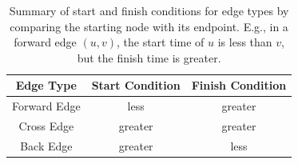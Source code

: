 \begin{table}[h]
    \centering
    \begin{tabular}{|c|c|c|}
        \hline
        \textbf{Edge Type} & \textbf{Start Condition} & \textbf{Finish Condition} \\ \hline
        Forward Edge & less & greater \\ \hline
        Cross Edge & greater & greater \\ \hline
        Back Edge & greater & less \\ \hline
    \end{tabular}
    \caption{Summary of start and finish conditions for edge types by comparing the starting node 
    with its endpoint. E.g., in a forward edge $(u, v)$, the start time of $u$ is less than $v$, but the finish time is greater.}
    \label{tab:edge_timestamps}
\end{table}

\newpage 